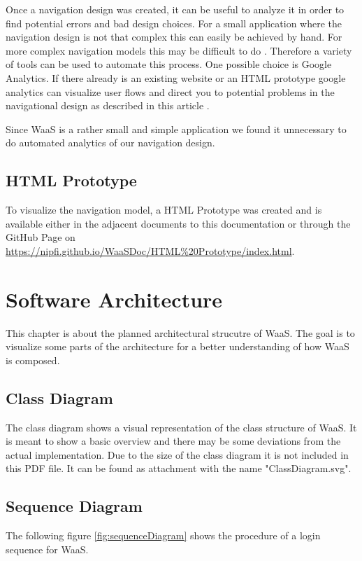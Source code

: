 \documentclass[titlepage, 12pt]{article}
\begin{document}
Once a navigation design was created, it can be useful to analyze it in order to find potential errors and bad design choices. For a small application where the navigation design is not that complex this can easily be achieved by hand. For more complex navigation models this may be difficult to do \cite{mSharonHurleyHall2019}. Therefore a variety of tools can be used to automate this process. One possible choice is Google Analytics. If there already is an existing website or an HTML prototype google analytics can visualize user flows and direct you to potential problems in the navigational design as described in this article \cite{mAndyCrestodina2018}.

Since WaaS is a rather small and simple application we found it unnecessary to do automated analytics of our navigation design.

\subsection{HTML Prototype}
To visualize the navigation model, a HTML Prototype was created and is available either in the adjacent documents to this documentation or through the GitHub Page on \url{https://nipfi.github.io/WaaSDoc/HTML%20Prototype/index.html}.

\section{Software Architecture}
This chapter is about the planned architectural strucutre of WaaS. The goal is to visualize some parts of the architecture for a better understanding of how WaaS is composed.

\subsection{Class Diagram}
The class diagram shows a visual representation of the class structure of WaaS. It is meant to show a basic overview and there may be some deviations from the actual implementation. Due to the size of the class diagram it is not included in this PDF file. It can be found as attachment with the name "ClassDiagram.svg".

\subsection{Sequence Diagram}
The following figure \ref{fig:sequenceDiagram} shows the procedure of a login sequence for WaaS.
\end{document}
